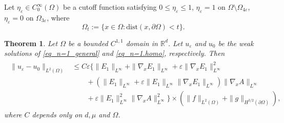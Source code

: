 \documentclass[reqno,12pt]{amsart} %
\newtheorem{theorem}{Theorem}[section]
\theoremstyle{definition}
\theoremstyle{remark}
\numberwithin{equation}{section}
\newcommand{\e}{\varepsilon}
\begin{document}
Let $\eta_\varepsilon\in C_0^\infty(\Omega)$ be a cutoff function satisfying $0\leq \eta_\varepsilon\leq 1$, $\eta_\varepsilon=1$ on $\Omega\setminus \Omega_{4\varepsilon}$, $\eta_\varepsilon=0$ on $\Omega_{3\varepsilon}$, where $$\Omega_t:=\{x\in \Omega: \mathrm{dist}(x, \partial\Omega)<t\}.$$

\begin{theorem}\label{thm_n=1_general}
  Let $\Omega$ be a bounded $C^{1, 1}$ domain in $\mathbb{R}^d$. Let $u_\e$ and $u_0$ be the weak solutions of \eqref{eq_n=1_general} and \eqref{eq_n=1.homo}, respectively. Then
  \begin{align*}
    \begin{split}
         \|u_\varepsilon-u_0\|_{L^2(\Omega)}& \leq C\varepsilon\big\{\|E_1\|_{L^\infty}+\|\nabla_xE_1\|_{L^\infty}+\varepsilon\|\nabla_xE_1\|_{L^\infty}^2\\
         &\qquad +(\|E_1\|_{L^\infty}+\varepsilon\|E_1\|_{L^\infty}\|\nabla_xE_1\|_{L^\infty})\|\nabla_xA\|_{L^\infty}\\
         &\qquad +\varepsilon \|E_1\|_{L^\infty}^2\|\nabla_xA\|_{L^\infty}^2\big\}\times (\|f\|_{L^2(\Omega)}+\|g\|_{H^{3/2}(\partial\Omega)}), 
    \end{split}
  \end{align*}
  where $C$ depends only on $d, \mu$ and $\Omega$. 
\end{theorem}
\end{document}
